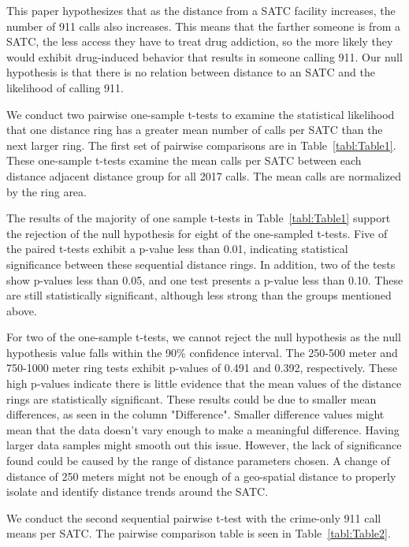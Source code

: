 \documentclass[12pt]{article}
\begin{document}
This paper hypothesizes that as the distance from a SATC facility increases, the number of 911 calls also increases. This means that the farther someone is from a SATC, the less access they have to treat drug addiction, so the more likely they would exhibit drug-induced behavior that results in someone calling 911. Our null hypothesis is that there is no relation between distance to an SATC and the likelihood of calling 911. 

We conduct two pairwise one-sample t-tests to examine the statistical likelihood that one distance ring has a greater mean number of calls per SATC than the next larger ring. The first set of pairwise comparisons are in Table~\ref{tabl:Table1}. These one-sample t-tests examine the mean calls per SATC between each distance adjacent distance group for all 2017 calls. The mean calls are normalized by the ring area. 



The results of the majority of one sample t-tests in Table~\ref{tabl:Table1} support the rejection of the null hypothesis for eight of the one-sampled t-tests. Five of the paired t-tests exhibit a p-value less than 0.01, indicating statistical significance between these sequential distance rings. In addition, two of the tests show p-values less than 0.05, and one test presents a p-value less than 0.10. These are still statistically significant, although less strong than the groups mentioned above. 


For two of the one-sample t-tests, we cannot reject the null hypothesis as the null hypothesis value falls within the 90\% confidence interval. The 250-500 meter and 750-1000 meter ring tests exhibit p-values of 0.491 and 0.392, respectively. These high p-values indicate there is little evidence that the mean values of the distance rings are statistically significant. These results could be due to smaller mean differences, as seen in the column "Difference". Smaller difference values might mean that the data doesn't vary enough to make a meaningful difference. Having larger data samples might smooth out this issue. However, the lack of significance found could be caused by the range of distance parameters chosen. A change of distance of 250 meters might not be enough of a geo-spatial distance to properly isolate and identify distance trends around the SATC.

We conduct the second sequential pairwise t-test with the crime-only 911 call means per SATC. The pairwise comparison table is seen in Table~\ref{tabl:Table2}. 
\end{document}
